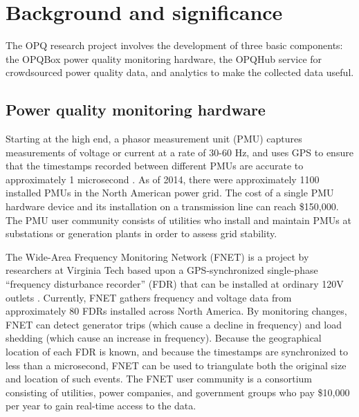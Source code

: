 
\section{Background and significance}


The OPQ research project involves the development of three basic components: the OPQBox power quality monitoring hardware, the OPQHub service for crowdsourced power quality data, and analytics to make the collected data useful. 

\subsection{Power quality monitoring hardware}
\label{sec:background-hardware}

Starting at the high end, a phasor measurement unit (PMU) captures measurements of voltage or current at a rate of 30-60 Hz, and uses GPS to ensure that the timestamps recorded between different PMUs are accurate to approximately 1 microsecond \cite{Zhang2007}. As of 2014, there were approximately 1100 installed PMUs in the North American power grid. The cost of a single PMU hardware device and its installation on a transmission line can reach \$150,000. The PMU user community consists of utilities who install and maintain PMUs at substations or generation plants in order to assess grid stability.

The Wide-Area Frequency Monitoring Network (FNET) is a project by researchers at Virginia Tech based upon a GPS-synchronized single-phase ``frequency disturbance recorder'' (FDR) that can be installed at ordinary 120V outlets \cite{Zhang2010}. Currently, FNET gathers frequency and voltage data from approximately 80 FDRs installed across North America.  By monitoring changes, FNET can detect generator trips (which cause a decline in frequency) and load shedding (which cause an increase in frequency). Because the geographical location of each FDR is known, and because the timestamps are synchronized to less than a microsecond, FNET can be used to triangulate both the original size and location of such events. The FNET user community is a consortium consisting of utilities, power companies, and government groups who pay \$10,000 per year to gain real-time access to the data. 

